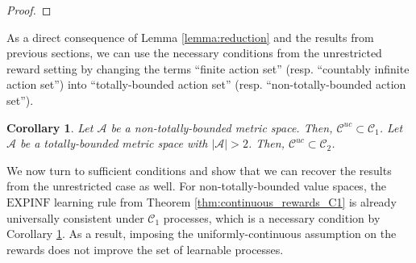 \documentclass[aos]{imsart}
\theoremstyle{plain}
\newtheorem{corollary}[theorem]{Corollary}
\theoremstyle{remark}
\newcommand{\Acal}{\mathcal{A}}
\newcommand{\Ccal}{\mathcal{C}}
\newcommand{\Xbb}{\mathbb{X}}
\newcommand{\1}{\mathbbm{1}}%
\newcommand{\comment}[1]{}
\newcommand{\mb}[1]{\ensuremath{\boldsymbol{#1}}}
\newcommand{\EXPINF}{\mathrm{EXPINF}}
\begin{document}
\begin{proof}
\comment{

\begin{equation*}
    \tilde r_t(a\mid \mb x_{\leq t}, \mb a_{\leq t-1})= F(r(\cdot\mid \mb x_{\leq t},(NN_S(a_s))_{s\leq t-1})).
\end{equation*}
Note that $NN$ takes values in $S$ hence $(NN_S(a_s))_{s\leq t-1}$ are valid actions that the mechanism $r_t$ could possibly take into account. Note that the mechanism $(\tilde r_t)_t$ only depends on the nearest neighbor of selected actions. Hence, the learning trajectory observed by using the learning rule $f_\cdot$ is equivalent to that of the learning rule $f^S_\cdot$ using rewards $(\tilde r_t)_t$. Denote $\tilde a_t$ the corresponding selected action. Observe that by construction of the functional $F$, for any learning trajectory and any $t\geq 1$, $\tilde r_t(\tilde a_t)\geq \tilde r_t(\hat a_t)$. Thus, by monotonicity, $f_\cdot^S$ is also consistent on rewards $(\tilde r_t)_t$. Now note that $\tilde f_\cdot$ only selects actions within $S$ and receives the same rewards that would have been observed by running the learning rule on reward mechanism $(r_t)_t$. As a result, $f^{S}_\cdot$ is also consistent on rewards $(r_t)_t$. This ends the proof that it is universally consistent under $\Xbb$ and hence $\Xbb\in\Ccal(S)$. This ends the proof of the proposition.

}
\end{proof}



As a direct consequence of Lemma \ref{lemma:reduction} and the results from previous sections, we can use the necessary conditions from the unrestricted reward setting by changing the terms ``finite action set'' (resp. ``countably infinite action set'') into ``totally-bounded action set'' (resp. ``non-totally-bounded action set'').

\begin{corollary}\label{cor:simple_upper_bounds}
Let $\Acal$ be a non-totally-bounded metric space. Then, $\Ccal^{uc} \subset \Ccal_1$.
Let $\Acal$ be a totally-bounded metric space with $|\Acal|>2$. Then, $\Ccal^{uc}  \subset \Ccal_2$.
\end{corollary}

We now turn to sufficient conditions and show that we can recover the results from the unrestricted case as well. For non-totally-bounded value spaces, the $\EXPINF$ learning rule from Theorem \ref{thm:continuous_rewards_C1} is already universally consistent under $\Ccal_1$ processes, which is a necessary condition by Corollary \ref{cor:simple_upper_bounds}. As a result, imposing the uniformly-continuous assumption on the rewards does not improve the set of learnable processes.
\end{document}
